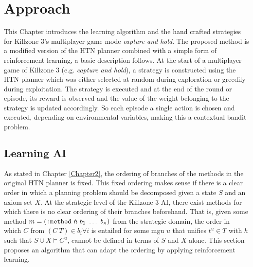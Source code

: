\chapter{Approach}
\label{Chapter5}
This Chapter introduces the learning algorithm and the hand crafted strategies
for Killzone 3's multiplayer game mode \emph{capture and hold}. The proposed
method is a modified version of the HTN planner combined with a simple form of
reinforcement learning, a basic description follows. At the start of a
multiplayer game of Killzone 3 (e.g. \emph{capture and hold}), a strategy is
constructed using the HTN planner which was either selected at random during
exploration or greedily during exploitation. The strategy is executed and at
the end of the round or episode, its reward is observed and the value of the
weight belonging to the strategy is updated accordingly. So each episode a
single action is chosen and executed, depending on environmental variables,
making this a contextual bandit problem.

\section{Learning AI}
As stated in Chapter \ref{Chapter2}, the ordering of branches of the methods in
the original HTN planner is fixed. This fixed ordering makes sense if there is
a clear order in which a planning problem should be decomposed given a state
$S$ and an axiom set $X$. At the strategic level of the Killzone 3 AI, there
exist methods for which there is no clear ordering of their branches
beforehand. That is, given some method $m = (\verb|:method|~h~b_1~\dots~b_n)$
from the strategic domain, the order in which $C$ from $(C~T) \in b_i \forall
i$ is entailed for some mgu $u$ that unifies $t^u \in T$ with $h$ such that $S
\cup X \vDash C^u$, cannot be defined in terms of $S$ and $X$ alone. This
section proposes an algorithm that can adapt the ordering by applying
reinforcement learning.

